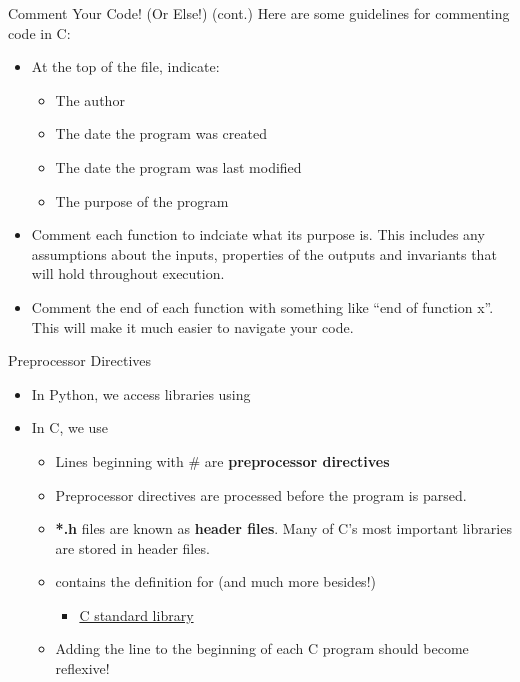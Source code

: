 \documentclass[11pt]{beamer}
\let\OldTexttt\texttt
\renewcommand{\texttt}[1]{\OldTexttt{\color{teal}{#1}}}
\begin{document}
\begin{frame}{Comment Your Code! (Or Else!) (cont.)}
Here are some guidelines for commenting code in C:
\begin{itemize}
\item At the top of the file, indicate:
	\begin{itemize}
	\item The author
	\item The date the program was created
	\item The date the program was last modified
	\item The purpose of the program
	\end{itemize}
\item Comment each function to indciate what its purpose is.  This includes any assumptions about the inputs, properties of the outputs and invariants that will hold throughout execution.
\item Comment the end of each function with something like ``end of function x''.  This will make it much easier to navigate your code. \texttt{But do not over comment.}
\end{itemize}
\end{frame}

\begin{frame}{Preprocessor Directives}
\begin{itemize}
\item In Python, we access libraries using \texttt{import ...}
\item In C, we use \texttt{\#include<...>}
\begin{itemize}
\item Lines beginning with \# are \textbf{preprocessor directives}
\item Preprocessor directives are processed before the program is parsed.  
\item \textbf{*.h} files are known as \textbf{header files}.  Many of C's most important libraries are stored in header files. 
\item \texttt{stdio.h} contains the definition for \texttt{printf} (and much more besides!)  
\begin{itemize}
    \item \href{https://www.tutorialspoint.com/c_standard_library/stdio_h.htm}{C standard library}
\end{itemize}
\item Adding the line \texttt{\#include<stdio.h>} to the beginning of each C program should become reflexive! 
\end{itemize}
\end{itemize}
\end{frame}
\end{document}
